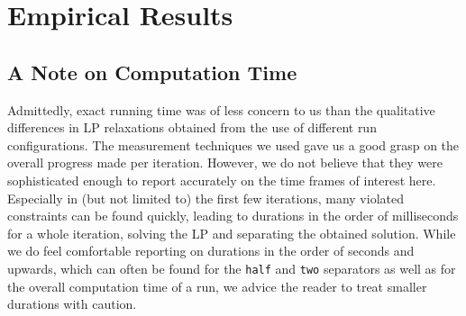 \section{Empirical Results}\label{sec:empirical_results}
\subsection{A Note on Computation Time}
Admittedly, exact running time was of less concern to us than the qualitative differences in LP relaxations obtained from the use of different run configurations.
The measurement techniques we used gave us a good grasp on the overall progress made per iteration.
However, we do not believe that they were sophisticated enough to report accurately on the time frames of interest here.
Especially in (but not limited to) the first few iterations, many violated constraints can be found quickly, leading to durations in the order of milliseconds for a whole iteration, \ie solving the LP and separating the obtained solution.
While we do feel comfortable reporting on durations in the order of seconds and upwards, which can often be found for the \texttt{half} and \texttt{two} separators as well as for the overall computation time of a run, we advice the reader to treat smaller durations with caution.
